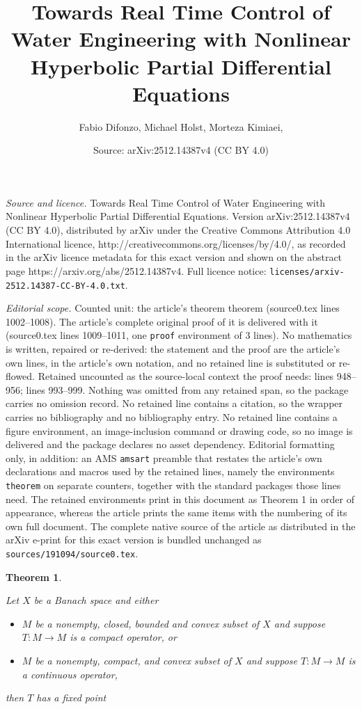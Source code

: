 \documentclass[10pt,a4paper]{amsart}
\title{Towards Real Time Control of Water Engineering with Nonlinear Hyperbolic Partial Differential Equations}
\author{Fabio Difonzo, Michael Holst, Morteza Kimiaei,}
\date{Source: arXiv:2512.14387v4 (CC BY 4.0)}
\newtheorem{theorem}{Theorem}
\begin{document}
\maketitle

\noindent\emph{Source and licence.} Towards Real Time Control of Water Engineering with Nonlinear Hyperbolic Partial Differential Equations. Version arXiv:2512.14387v4 (CC BY 4.0), distributed by arXiv under the Creative Commons Attribution 4.0 International licence, http://creativecommons.org/licenses/by/4.0/, as recorded in the arXiv licence metadata for this exact version and shown on the abstract page https://arxiv.org/abs/2512.14387v4. Full licence notice: \texttt{licenses/arxiv-2512.14387-CC-BY-4.0.txt}.\par\smallskip

\noindent\textit{Editorial scope.} Counted unit: the article's theorem theorem (source0.tex lines 1002--1008). The article's complete original proof of it is delivered with it (source0.tex lines 1009--1011, one \texttt{proof} environment of 3 lines). No mathematics is written, repaired or re-derived: the statement and the proof are the article's own lines, in the article's own notation, and no retained line is substituted or re-flowed.  Retained uncounted as the source-local context the proof needs: lines 948--956; lines 993--999.  Nothing was omitted from any retained span, so the package carries no omission record.  No retained line contains a citation, so the wrapper carries no bibliography and no bibliography entry.  No retained line contains a figure environment, an image-inclusion command or drawing code, so no image is delivered and the package declares no asset dependency.  Editorial formatting only, in addition: an AMS \texttt{amsart} preamble that restates the article's own declarations and macros used by the retained lines, namely the environments \texttt{theorem} on separate counters, together with the standard packages those lines need.  The retained environments print in this document as Theorem 1 in order of appearance, whereas the article prints the same items with the numbering of its own full document.  The complete native source of the article as distributed in the arXiv e-print for this exact version is bundled unchanged as \texttt{sources/191094/source0.tex}.
\begin{theorem}\label{th:shauder}

Let $X$ be a Banach space and either
\begin{itemize}
    \item  $M$ be a nonempty, closed, bounded and convex subset of $X$ and suppose $T:M\to M$ is a compact operator, or
    \item  $M$ be a nonempty, compact,  and convex subset of $X$ and suppose $T:M\to M$ is a continuous operator,
\end{itemize}
then $T$ has a fixed point 
\end{theorem}
\end{document}
